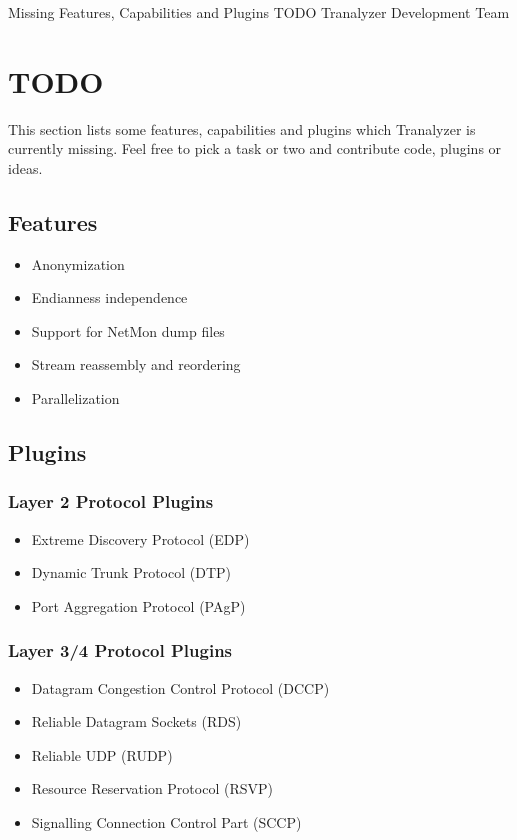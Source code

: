\documentclass[documentation]{subfiles}
\begin{document}
\trantitle
    {Missing Features, Capabilities and Plugins}
    {TODO} %
    {Tranalyzer Development Team} %

\section{TODO}
This section lists some features, capabilities and plugins which Tranalyzer is currently missing.
Feel free to pick a task or two and contribute code, plugins or ideas.

\subsection{Features}
    \begin{itemize}
        \item Anonymization
        \item Endianness independence
        \item Support for NetMon dump files
        \item Stream reassembly and reordering
        \item Parallelization
    \end{itemize}

\subsection{Plugins}

\subsubsection{Layer 2 Protocol Plugins}

\begin{itemize}
    \item Extreme Discovery Protocol (EDP)
    \item Dynamic Trunk Protocol (DTP)
    \item Port Aggregation Protocol (PAgP)
\end{itemize}

\subsubsection{Layer 3/4 Protocol Plugins}

\begin{itemize}
    \item Datagram Congestion Control Protocol (DCCP)
    \item Reliable Datagram Sockets (RDS)
    \item Reliable UDP (RUDP)
    \item Resource Reservation Protocol (RSVP)
    \item Signalling Connection Control Part (SCCP)
\end{itemize}
\end{document}
